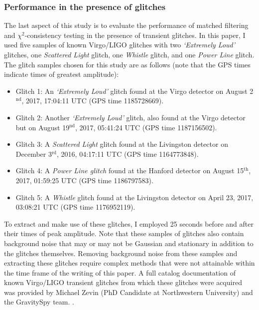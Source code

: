 \documentclass[preprint,
letterpaper,
 amsmath,amssymb,
 aps,
]{revtex4-2}
\begin{document}
\subsubsection{Performance in the presence of glitches}

The last aspect of this study is to evaluate the performance of matched filtering and $\chi^2$-consistency testing in the presence of transient glitches. In this paper, I used five samples of known Virgo/LIGO glitches with two \textit{`Extremely Loud'} glitches, one \textit{Scattered Light} glitch, one \textit{Whistle} glitch, and one \textit{Power Line} glitch. The glitch samples chosen for this study are as follows (note that the GPS times indicate times of greatest amplitude):

\begin{itemize}
\item Glitch 1: An \textit{`Extremely Loud'} glitch found at the Virgo detector on August 2$^{\text{nd}}$, 2017, 17:04:11 UTC (GPS time 1185728669).

\item Glitch 2: Another \textit{`Extremely Loud'} glitch, also found at the Virgo detector but on August 19$^{\text{nd}}$, 2017, 05:41:24 UTC (GPS time 1187156502).

\item Glitch 3: A \textit{Scattered Light} glitch found at the Livingston detector on December 3$^{\text{rd}}$, 2016, 04:17:11 UTC (GPS time 1164773848).

\item Glitch 4: A \textit{Power Line glitch} found at the Hanford detector on August 15$^{\text{th}}$, 2017, 01:59:25 UTC (GPS time 1186797583).

\item Glitch 5: A \textit{Whistle} glitch found at the Livingston detector on April 23, 2017, 03:08:21 UTC (GPS time 1176952119).
\end{itemize}

To extract and make use of these glitches,  I employed 25 seconds before and after their times of peak amplitude. Note that these samples of glitches also contain background noise that may or may not be Gaussian and stationary in addition to the glitches themselves. Removing background noise from these samples and extracting these glitches require complex methods that were not attainable within the time frame of the writing of this paper. A full catalog documentation of known Virgo/LIGO transient glitches from which these glitches were acquired was provided by Michael Zevin (PhD Candidate at Northwestern University) and the GravitySpy team. \cite{gravityspy}. 
\end{document}

